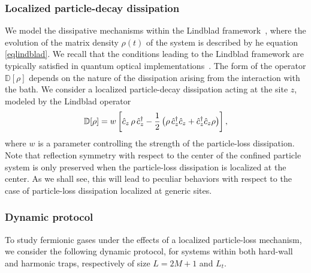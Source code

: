   
  
  \subsubsection{Localized particle-decay dissipation}
  \label{locdiss}
  
  We model the dissipative mechanisms within the Lindblad
  framework~\cite{Lindblad-76,GKS-76}, where the evolution of the matrix
  density $\rho(t)$ of the system is described by he
  equation~\cite{BP-openquantumsystembook,RH-book}
  \eqref{eqlindblad}.
  We recall that the conditions leading to the Lindblad framework are
  typically satisfied in quantum optical
  implementations~\cite{BDS-2015-KeldyshOptical,dr2021self}.  The form of the operator
  ${\mathbb D}[\rho]$ depends on the nature of the dissipation arising
  from the interaction with the bath.  We consider a localized
  particle-decay dissipation acting at the site $z$, modeled by the
  Lindblad operator~\cite{HC-13, KMSFR-17, N-2019-uniquenesslindblad, NRV-2019-competingdissipativeandcoherent, WSDK-20,
    FMKCD-20, dr2021self,rossini2021coherent}
  \begin{eqnarray}
  \mathbb{D}[\rho] = w\,\biggr[
      \hat c_{z}\,\rho\,\hat c_{z}^\dagger - {1\over 2}\left( \rho\,
      \hat c_z^\dagger \hat c_{z} + \hat c_z^\dagger \hat c_{z} \rho \right)
      \biggr] \,, 
  \label{Lindop}
  \end{eqnarray}
  where $w$ is a parameter controlling the strength of the particle-loss
  dissipation.
  Note that reflection symmetry with respect to
    the center of the confined particle system is only preserved when
    the particle-loss dissipation is localized at the center. As we
    shall see, this will lead to peculiar behaviors with respect to the
    case of particle-loss dissipation localized at generic sites.
  
  
 
  \subsubsection{Dynamic protocol}
  \label{dynprot}
  
  To study fermionic gases under the effects of a localized
  particle-loss mechanism, we consider the following dynamic protocol,
  for systems within both hard-wall and harmonic traps, respectively of
  size $L=2M+1$ and $L_t$.
  
